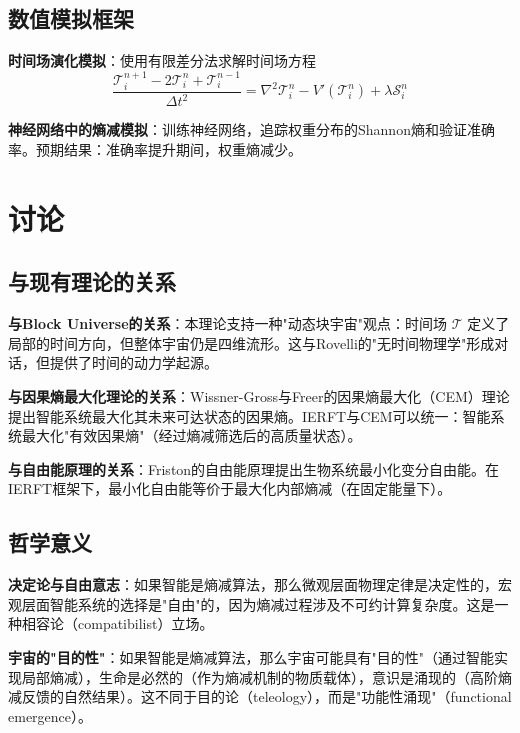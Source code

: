\documentclass[12pt,a4paper]{article}
\begin{document}
\subsection{数值模拟框架}

\textbf{时间场演化模拟}：使用有限差分法求解时间场方程
\begin{equation}
\frac{\mathcal{T}^{n+1}_i - 2\mathcal{T}^n_i + \mathcal{T}^{n-1}_i}{\Delta t^2} = \nabla^2 \mathcal{T}^n_i - V'(\mathcal{T}^n_i) + \lambda \mathcal{S}_i^n
\end{equation}

\textbf{神经网络中的熵减模拟}：训练神经网络，追踪权重分布的Shannon熵和验证准确率。预期结果：准确率提升期间，权重熵减少。

\section{讨论}

\subsection{与现有理论的关系}

\textbf{与Block Universe的关系}：本理论支持一种"动态块宇宙"观点：时间场 $\mathcal{T}$ 定义了局部的时间方向，但整体宇宙仍是四维流形。这与Rovelli的"无时间物理学"形成对话，但提供了时间的动力学起源。

\textbf{与因果熵最大化理论的关系}：Wissner-Gross与Freer\cite{WissnerGross2013}的因果熵最大化（CEM）理论提出智能系统最大化其未来可达状态的因果熵。IERFT与CEM可以统一：智能系统最大化"有效因果熵"（经过熵减筛选后的高质量状态）。

\textbf{与自由能原理的关系}：Friston的自由能原理提出生物系统最小化变分自由能。在IERFT框架下，最小化自由能等价于最大化内部熵减（在固定能量下）。

\subsection{哲学意义}

\textbf{决定论与自由意志}：如果智能是熵减算法，那么微观层面物理定律是决定性的，宏观层面智能系统的选择是"自由"的，因为熵减过程涉及不可约计算复杂度。这是一种相容论（compatibilist）立场。

\textbf{宇宙的"目的性"}：如果智能是熵减算法，那么宇宙可能具有"目的性"（通过智能实现局部熵减），生命是必然的（作为熵减机制的物质载体），意识是涌现的（高阶熵减反馈的自然结果）。这不同于目的论（teleology），而是"功能性涌现"（functional emergence）。
\end{document}
